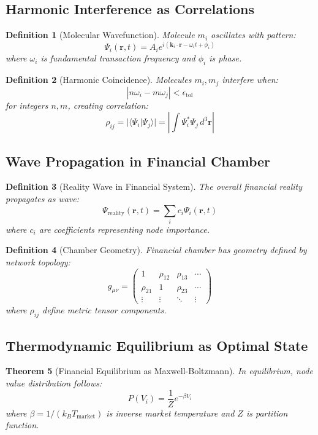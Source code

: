\documentclass[12pt]{article}
\newtheorem{theorem}{Theorem}
\newtheorem{definition}[theorem]{Definition}
\begin{document}
\subsection{Harmonic Interference as Correlations}

\begin{definition}[Molecular Wavefunction]
Molecule $m_i$ oscillates with pattern:
$$
\Psi_i(\mathbf{r},t) = A_i e^{i(\mathbf{k}_i \cdot \mathbf{r} - \omega_i t + \phi_i)}
$$
where $\omega_i$ is fundamental transaction frequency and $\phi_i$ is phase.
\end{definition}

\begin{definition}[Harmonic Coincidence]
Molecules $m_i, m_j$ interfere when:
$$
|n\omega_i - m\omega_j| < \epsilon_{\text{tol}}
$$
for integers $n,m$, creating correlation:
$$
\rho_{ij} = |\langle \Psi_i | \Psi_j \rangle| = \left|\int \Psi_i^* \Psi_j \, d^3\mathbf{r}\right|
$$
\end{definition}

\subsection{Wave Propagation in Financial Chamber}

\begin{definition}[Reality Wave in Financial System]
The overall financial reality propagates as wave:
$$
\Psi_{\text{reality}}(\mathbf{r},t) = \sum_{i} c_i \Psi_i(\mathbf{r},t)
$$
where $c_i$ are coefficients representing node importance.
\end{definition}

\begin{definition}[Chamber Geometry]
Financial chamber has geometry defined by network topology:
$$
g_{\mu\nu} = \begin{pmatrix}
1 & \rho_{12} & \rho_{13} & \cdots \\
\rho_{21} & 1 & \rho_{23} & \cdots \\
\vdots & \vdots & \ddots & \vdots
\end{pmatrix}
$$
where $\rho_{ij}$ define metric tensor components.
\end{definition}

\subsection{Thermodynamic Equilibrium as Optimal State}

\begin{theorem}[Financial Equilibrium as Maxwell-Boltzmann]
In equilibrium, node value distribution follows:
$$
P(V_i) = \frac{1}{Z} e^{-\beta V_i}
$$
where $\beta = 1/(k_B T_{\text{market}})$ is inverse market temperature and $Z$ is partition function.
\end{theorem}
\end{document}
